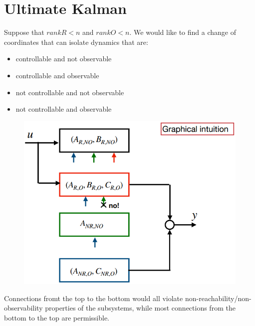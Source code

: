 \documentclass[english]{lectures}
\begin{document}
\chapter{Ultimate Kalman}
Suppose that $rankR<n$ and $rankO<n$. We would like to find a change of coordinates that can isolate dynamics that are:
\begin{itemize}
    \item controllable and not observable
    \item controllable and observable
    \item not controllable and not observable
    \item not controllable and observable
\end{itemize}
\begin{figure}[H]
    \centering
    \includegraphics[width=0.8\linewidth]{images/Ult_Kalman.png}
\end{figure}

Connections fromt the top to the bottom would all violate non-reachability/non-observability properties of the subsystems, while most connections from the bottom to the top are permissible.
\end{document}
